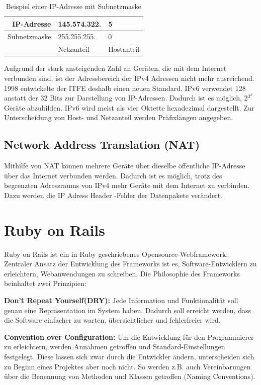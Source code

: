 \begin{table}
\begin{center}
\caption{Beispiel einer IP-Adresse mit Subnetzmaske}
\begin{tabular}{|r|l|l|}
	\hline
	IP-Adresse & 145.574.322. & 5 \\ \hline
	Subnetzmaske & 255.255.255. & 0 \\ \hline
	& Netzanteil & Hostanteil \\
	\hline
\end{tabular}
\end{center}
\end{table}


Aufgrund der stark ansteigenden Zahl an Geräten, die mit dem Internet verbunden sind, ist der Adressbereich der IPv4 Adressen nicht mehr ausreichend. 1998 entwickelte der ITFE deshalb einen neuen Standard. IPv6 verwendet 128 anstatt der 32 Bits zur Darstellung von IP-Adressen. Dadurch ist es möglich, 2$^3^2$ Geräte abzubilden. IPv6 wird meist als vier Oktette hexadezimal dargestellt. Zur Unterscheidung von Host- und Netzanteil werden Präfixlängen angegeben.  

\subsection{Network Address Translation (NAT)}
Mithilfe von NAT können mehrere Geräte über dieselbe öffentliche IP-Adresse über das Internet verbunden werden. Dadurch ist es möglich, trotz des begrenzten Adressraums von IPv4 mehr Geräte mit dem Internet zu verbinden. Dazu werden die IP Adress Header -Felder der Datenpakete verändert. 

\section{Ruby on Rails}
Ruby on Rails ist ein in Ruby geschriebenes Opensource-Webframework. Zentraler Ansatz der Entwicklung des Frameworks ist es, Software-Entwicklern zu erleichtern, Webanwendungen zu schreiben. Die Philosophie des Frameworks beinhaltet zwei Prinzipien\cite{ror-guide}:

\textbf{Don't Repeat Yourself(DRY):}
Jede Information und Funktionalität soll genau eine Repräsentation im System haben. Dadurch soll erreicht werden, dass die Software einfacher zu warten, über­sicht­licher und fehlerfreier wird.
 
\textbf{Convention over Configuration:}
Um die Entwicklung für den Programmierer zu erleichtern, werden Annahmen getroffen und Standard-Einstellungen festgelegt. Diese lassen sich zwar durch die Entwickler ändern, unterscheiden sich zu Beginn eines Projektes aber noch nicht. So werden z.B. auch Vereinbarungen über die Benennung von Methoden und Klassen getroffen (Naming Conventions).

